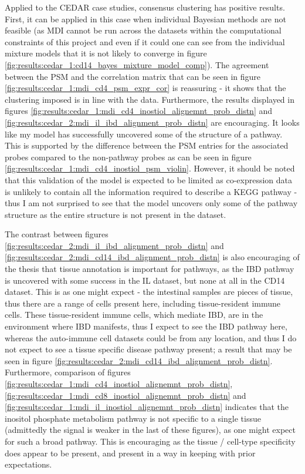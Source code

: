 \documentclass[12pt]{article} %
\begin{document}
	Applied to the CEDAR case studies, consensus clustering has positive results. First, it can be applied in this case when individual Bayesian methods are not feasible (as MDI cannot be run across the datasets within the computational constraints of this project and even if it could one can see from the individual mixture models that it is not likely to converge in figure  \ref{fig:results:cedar_1:cd14_bayes_mixture_model_comp}). The agreement between the PSM and the correlation matrix that can be seen in figure \ref{fig:results:cedar_1:mdi_cd4_psm_expr_cor} is reassuring - it shows that the clustering imposed is in line with the data. Furthermore, the results displayed in figures \ref{fig:results:cedar_1:mdi_cd4_inostiol_alignemnt_prob_distn} and \ref{fig:results:cedar_2:mdi_il_ibd_alignment_prob_distn} are encouraging. It looks like my model has successfully uncovered some of the structure of a pathway. This is supported by the difference between the PSM entries for the associated probes compared to the non-pathway probes as can be seen in figure \ref{fig:results:cedar_1:mdi_cd4_inostiol_psm_violin}. However, it should be noted that this validation of the model is expected to be limited as co-expression data is unlikely to contain all the information required to describe a KEGG pathway - thus I am not surprised to see that the model uncovers only some of the pathway structure as the entire structure is not present in the dataset.
	
	The contrast between figures \ref{fig:results:cedar_2:mdi_il_ibd_alignment_prob_distn} and \ref{fig:results:cedar_2:mdi_cd14_ibd_alignment_prob_distn} is also encouraging of the thesis that tissue annotation is important for pathways, as the IBD pathway is uncovered with some success in the IL dataset, but none at all in the CD14 dataset. This is as one might expect - the intestinal samples are pieces of tissue, thus there are a range of cells present here, including tissue-resident immune cells. These tissue-resident immune cells, which mediate IBD, are in the environment where IBD manifests, thus I expect to see the IBD pathway here, whereas the auto-immune cell datasets could be from any location, and thus I do not expect to see a tissue specific disease pathway present; a result that may be seen in figure \ref{fig:results:cedar_2:mdi_cd14_ibd_alignment_prob_distn}. Furthermore, comparison of figures \ref{fig:results:cedar_1:mdi_cd4_inostiol_alignemnt_prob_distn},  \ref{fig:results:cedar_1:mdi_cd8_inostiol_alignemnt_prob_distn} and \ref{fig:results:cedar_1:mdi_il_inostiol_alignemnt_prob_distn} indicates that the inositol phosphate metabolism pathway is not specific to a single tissue (admittedly the signal is weaker in the last of these figures), as one might expect for such a broad pathway. This is encouraging as the tissue / cell-type specificity does appear to be present, and present in a way in keeping with prior expectations.
	
\end{document}

